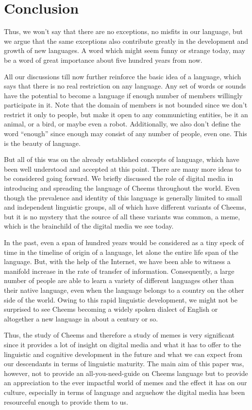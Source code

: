 \def\DevnagVersion{2.17}\documentclass{article}
\begin{document}
\section{Conclusion}
Thus, we won't say that there are no exceptions, no misfits in our language, but we argue that the same exceptions also contribute greatly in the development and growth of new languages. A word which might seem funny or strange today, may be a word of great importance about five hundred years from now.\par
All our discussions till now further reinforce the basic idea of a language, which says that there is no real restriction on any language. Any set of words or sounds have the potential to become a language if enough number of members willingly participate in it. Note that the domain of members is not bounded since we don't restrict it only to people, but make it open to any communicting entities, be it an animal, or a bird, or maybe even a robot. Additionally, we also don't define the word ``enough'' since enough may consist of any number of people, even one. This is the beauty of language. \par
But all of this was on the already established concepts of language, which have been well understood and accepted at this point. There are many more ideas to be considered going forward. We briefly discussed the role of digital media in introducing and spreading the language of Cheems throughout the world. Even though the prevalence and identity of this language is generally limited to small and independent linguistic groups, all of which have different variants of Cheems, but it is no mystery that the source of all these variants was common, a meme, which is the brainchild of the digital media we see today. \par
In the past, even a span of hundred years would be considered as a tiny speck of time in the timeline of origin of a language, let alone the entire life span of the language. But, with the help of the Internet, we have been able to witness a manifold increase in the rate of transfer of information. Consequently, a large number of people are able to learn a variety of different languages other than their native language, even when the language belongs to a country on the other side of the world.
Owing to this rapid linguistic development, we might not be surprised to see Cheems becoming a widely spoken dialect of English or altogether a new language in about a century or so. \par
Thus, the study of Cheems and therefore a study of memes is very significant since it provides a lot of insight on digital media and what it has to offer to the linguistic and cognitive development in the future and what we can expect from our descendants in terms of linguistic maturity. The main aim of this paper was, however, not to provide an all-you-need-guide on Cheems language but to provide an appreciation to the ever impactful world of memes and the effect it has on our culture, especially in terms of language and arguehow the digital media has been resourceful enough to provide them to us.
\end{document}
